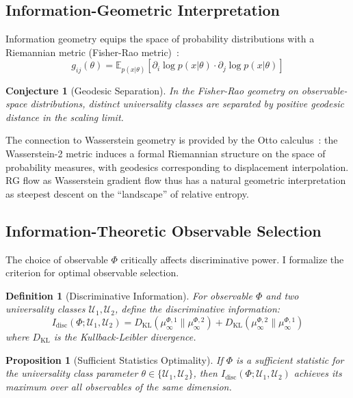 \documentclass[aps,pre,reprint,amsmath,amssymb,superscriptaddress]{revtex4-2}
\newtheorem{conjecture}{Conjecture}
\newtheorem{definition}{Definition}
\newtheorem{proposition}{Proposition}
\newcommand{\bbE}{\mathbb{E}}
\begin{document}
\subsection{Information-Geometric Interpretation}

Information geometry equips the space of probability distributions with a Riemannian metric (Fisher-Rao metric)~\cite{Rao1945}:
\begin{equation}
g_{ij}(\theta) = \bbE_{p(x|\theta)}\left[\partial_i \log p(x|\theta) \cdot \partial_j \log p(x|\theta)\right]
\end{equation}

\begin{conjecture}[Geodesic Separation]
In the Fisher-Rao geometry on observable-space distributions, distinct universality classes are separated by positive geodesic distance in the scaling limit.
\end{conjecture}

The connection to Wasserstein geometry is provided by the Otto calculus~\cite{Otto2001}: the Wasserstein-2 metric induces a formal Riemannian structure on the space of probability measures, with geodesics corresponding to displacement interpolation. RG flow as Wasserstein gradient flow thus has a natural geometric interpretation as steepest descent on the ``landscape'' of relative entropy.

\subsection{Information-Theoretic Observable Selection}

The choice of observable $\Phi$ critically affects discriminative power. I formalize the criterion for optimal observable selection.

\begin{definition}[Discriminative Information]
For observable $\Phi$ and two universality classes $\mathcal{U}_1, \mathcal{U}_2$, define the discriminative information:
\begin{equation}
I_{\text{disc}}(\Phi; \mathcal{U}_1, \mathcal{U}_2) = D_{\text{KL}}(\mu^{\Phi,1}_\infty \| \mu^{\Phi,2}_\infty) + D_{\text{KL}}(\mu^{\Phi,2}_\infty \| \mu^{\Phi,1}_\infty)
\end{equation}
where $D_{\text{KL}}$ is the Kullback-Leibler divergence.
\end{definition}

\begin{proposition}[Sufficient Statistics Optimality]
\label{prop:sufficient}
If $\Phi$ is a sufficient statistic for the universality class parameter $\theta \in \{\mathcal{U}_1, \mathcal{U}_2\}$, then $I_{\text{disc}}(\Phi; \mathcal{U}_1, \mathcal{U}_2)$ achieves its maximum over all observables of the same dimension.
\end{proposition}
\end{document}

